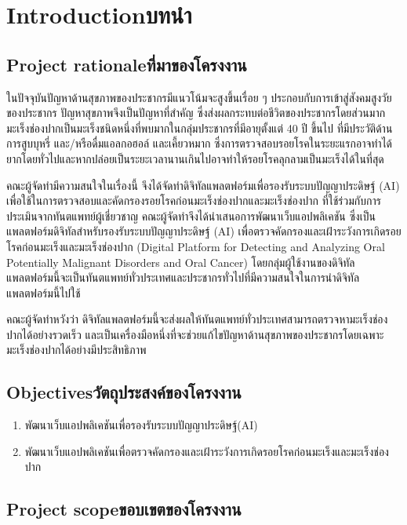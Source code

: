 \chapter{\ifenglish Introduction\else บทนำ\fi}

\section{\ifenglish Project rationale\else ที่มาของโครงงาน\fi}

ในปัจจุบันปัญหาด้านสุขภาพของประชากรมีแนวโน้มจะสูงขึ้นเรื่อย ๆ ประกอบกับการเข้าสู่สังคมสูงวัยของประชากร ปัญหาสุขภาพจึงเป็นปัญหาที่สำคัญ ซึ่งส่งผลกระทบต่อชีวิตของประชากรโดยส่วนมาก มะเร็งช่องปากเป็นมะเร็งชนิดหนึ่งที่พบมากในกลุ่มประชากรที่มีอายุตั้งแต่ 40 ปี ขึ้นไป ที่มีประวัติด้านการสูบบุหรี่ และ/หรือดื่มแอลกอฮอล์ และเคี้ยวหมาก ซึ่งการตรวจสอบรอยโรคในระยะแรกอาจทำได้ยากโดยทั่วไปและหากปล่อยเป็นระยะเวลานานเกินไปอาจทำให้รอยโรคลุกลามเป็นมะเร็งได้ในที่สุด 

คณะผู้จัดทำมีความสนใจในเรื่องนี้ จึงได้จัดทำดิจิทัลแพลตฟอร์มเพื่อรองรับระบบปัญญาประดิษฐ์ (AI) เพื่อใช้ในการตรวจสอบและคัดกรองรอยโรคก่อนมะเร็งช่องปากและมะเร็งช่องปาก ที่ใช้ร่วมกับการประเมินจากทันตแพทย์ผู้เชี่ยวชาญ คณะผู้จัดทำจึงได้นำเสนอการพัฒนาเว็บแอปพลิเคชัน ซึ่งเป็นแพลตฟอร์มดิจิทัลสำหรับรองรับระบบปัญญาประดิษฐ์ (AI) เพื่อตรวจคัดกรองและเฝ้าระวังการเกิดรอยโรคก่อนมะเร็งและมะเร็งช่องปาก (Digital Platform for Detecting and Analyzing Oral Potentially Malignant Disorders and Oral Cancer) โดยกลุ่มผู้ใช้งานของดิจิทัลแพลตฟอร์มนี้จะเป็นทันตแพทย์ทั่วประเทศและประชากรทั่วไปที่มีความสนใจในการนำดิจิทัลแพลตฟอร์มนี้ไปใช้ 

คณะผู้จัดทำหวังว่า ดิจิทัลแพลตฟอร์มนี้จะส่งผลให้ทันตแพทย์ทั่วประเทศสามารถตรวจหามะเร็งช่องปากได้อย่างรวดเร็ว และเป็นเครื่องมือหนึ่งที่จะช่วยแก้ไขปัญหาด้านสุขภาพของประชากรโดยเฉพาะมะเร็งช่องปากได้อย่างมีประสิทธิภาพ
\section{\ifenglish Objectives\else วัตถุประสงค์ของโครงงาน\fi}
\begin{enumerate}
    \item พัฒนาเว็บแอปพลิเคชันเพื่อรองรับระบบปัญญาประดิษฐ์(AI)
    \item พัฒนาเว็บแอปพลิเคชันเพื่อตรวจคัดกรองและเฝ้าระวังการเกิดรอยโรคก่อนมะเร็งและมะเร็งช่องปาก
\end{enumerate}

\section{\ifenglish Project scope\else ขอบเขตของโครงงาน\fi}

